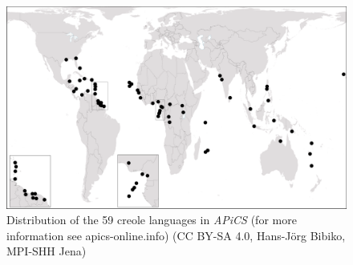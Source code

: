 \documentclass[output=paper]{langsci/langscibook}
\begin{document}
\begin{figure}
\includegraphics[width=\textwidth]{figures/Michaelis-Fig1.png}
\caption{Distribution of the 59 creole languages in \textit{APiCS} (for more information see apics-online.info) (CC BY-SA 4.0, Hans-Jörg Bibiko, MPI-SHH Jena)}
\label{fig:michaelis:1}
\end{figure}

\sloppy
\printbibliography[heading=subbibliography,notkeyword=this] 
\end{document}
